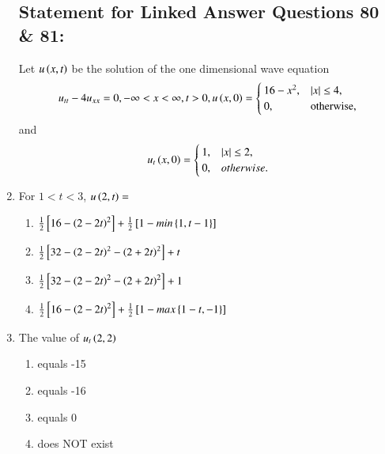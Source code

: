 \documentclass[journal]{IEEEtran}
\begin{document}
\begin{enumerate}
\subsection*{Statement for Linked Answer Questions 80 \& 81:}
Let $u\left(x,t\right)$ be the solution of the one dimensional wave equation
\begin{align*}
    u_{tt} - 4 u_{xx} = 0, -{\infty} < x < {\infty}, t>0,
    u\left(x,0\right) = 
    \begin{cases}
        16-x^2, & \left\vert x\right\vert \leq 4,\\
        0, & \text{otherwise},
    \end{cases}
\end{align*}
and
\begin{align*}
    u_t \left(x,0\right) = 
    \begin{cases}
        1, & \left\vert x\right\vert \leq 2,\\
        0, & otherwise.
    \end{cases}
\end{align*}
\item For $1 < t < 3$, $u\left(2,t\right) = $
\begin{enumerate}
    \item $\frac{1}{2}{}\left[16-\left(2-2t\right)^2\right] + \frac{1}{2}{}\left[1 - min\left\{1, t-1\right\}\right]$
    \item $\frac{1}{2}{}\left[32-\left(2-2t\right)^2 - \left(2+2t\right)^2\right] + t$
    \item $\frac{1}{2}{}\left[32-\left(2-2t\right)^2 - \left(2+2t\right)^2\right] + 1$
    \item $\frac{1}{2}{}\left[16-\left(2-2t\right)^2\right] + \frac{1}{2}{}\left[1 - max\left\{1-t, -1\right\}\right]$
\end{enumerate}
\item The value of $u_t\left(2,2\right)$
\begin{multicols}{2}
    \begin{enumerate}
        \item equals -15
        \item equals -16
        \item equals 0
        \item does NOT exist
    \end{enumerate}
\end{multicols}


\end{enumerate}
\end{document}
